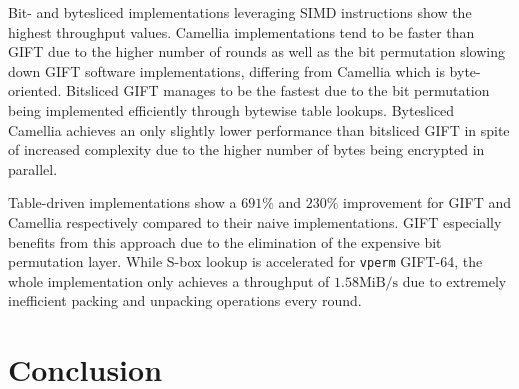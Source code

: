 Bit- and bytesliced implementations leveraging SIMD instructions show the
highest throughput values. Camellia implementations tend to be faster than GIFT
due to the higher number of rounds as well as the bit permutation slowing down
GIFT software implementations, differing from Camellia which is byte-oriented.
Bitsliced GIFT manages to be the fastest due to the bit permutation being
implemented efficiently through bytewise table lookups. Bytesliced Camellia
achieves an only slightly lower performance than bitsliced GIFT in spite of
increased complexity due to the higher number of bytes being encrypted in
parallel.

Table-driven implementations show a $691\%$ and $230\%$ improvement for GIFT
and Camellia respectively compared to their naive implementations. GIFT
especially benefits from this approach due to the elimination of the expensive
bit permutation layer. While S-box lookup is accelerated for \texttt{vperm}
GIFT-64, the whole implementation only achieves a throughput of
$1.58\text{MiB/s}$ due to extremely inefficient packing and unpacking
operations every round.

\section{Conclusion}
